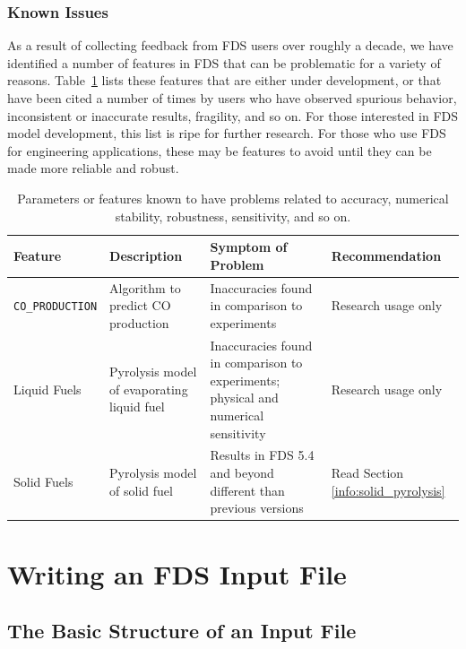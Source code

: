 \documentclass[11pt]{book}
\newcommand{\ct}{\tt\small}
\begin{document}
\section{Known Issues}
\label{info:Known_Issues}

As a result of collecting feedback from FDS users over roughly a decade, we have identified a number of features in FDS that can be problematic for a
variety of reasons.
Table~\ref{tbl:Known_Issues} lists these features that are either under development, or that have been cited a number of
times by users who have observed spurious behavior, inconsistent or inaccurate results, fragility, and so on. For those interested in
FDS model development, this list is ripe for further research. For those who use FDS for engineering applications, these may be features to avoid until
they can be made more reliable and robust.

\begin{table}
\caption[FDS features with known issues or problems.]{Parameters or features known to have problems related to accuracy, numerical stability, robustness,
sensitivity, and so on.}
\label{tbl:Known_Issues}
\begin{tabular}{|p{}|p{2.1in}|p{2.1in}|p{2.1in}|}
\hline
Feature & Description & Symptom of Problem & Recommendation \\
\hline \hline
{\ct CO\_PRODUCTION} & Algorithm to predict CO production    & Inaccuracies found in comparison to experiments       & Research usage only    \\ \hline
Liquid Fuels         & Pyrolysis model of evaporating liquid fuel  & Inaccuracies found in comparison to experiments; physical and numerical sensitivity  & Research usage only    \\ \hline
Solid Fuels     & Pyrolysis model of solid fuel  & Results in FDS 5.4 and beyond different than previous versions  & Read Section \ref{info:solid_pyrolysis}   \\ \hline
\end{tabular}
\end{table}






\part{Writing an FDS Input File}
\label{info:inputfilecreation}



\chapter{The Basic Structure of an Input File}
\label{info:fdsBasic}
\end{document}
